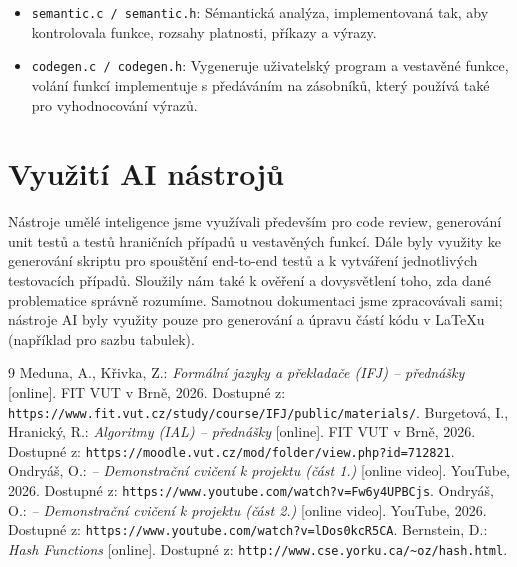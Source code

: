 \documentclass[11pt,a4paper]{article}
\begin{document}
\begin{itemize}
    \item \texttt{semantic.c / semantic.h}: Sémantická analýza, implementovaná tak, aby kontrolovala funkce, rozsahy platnosti, příkazy a výrazy.
    \item \texttt{codegen.c / codegen.h}: Vygeneruje uživatelský program a vestavěné funkce, volání funkcí implementuje s předáváním na zásobníků, který používá také pro vyhodnocování výrazů.
\end{itemize}

\newpage
\section{Využití AI nástrojů}
Nástroje umělé inteligence jsme využívali především pro code review, generování unit testů a testů hraničních případů u vestavěných funkcí. Dále byly využity ke generování skriptu pro spouštění end-to-end testů a k vytváření jednotlivých testovacích případů. Sloužily nám také k ověření a dovysvětlení toho, zda dané problematice správně rozumíme. Samotnou dokumentaci jsme zpracovávali sami; nástroje AI byly využity pouze pro generování a úpravu částí kódu v LaTeXu (například pro sazbu tabulek).

\begin{thebibliography}{9}
     Meduna, A., Křivka, Z.: \textit{Formální jazyky a překladače (IFJ) -- přednášky} [online]. FIT VUT v Brně, 2026. Dostupné z: \texttt{https://www.fit.vut.cz/study/course/IFJ/public/materials/}.
     Burgetová, I., Hranický, R.: \textit{Algoritmy (IAL) -- přednášky} [online]. FIT VUT v Brně, 2026. Dostupné z: \texttt{https://moodle.vut.cz/mod/folder/view.php?id=712821}.
     Ondryáš, O.: \textit{– Demonstrační cvičení k projektu (část 1.)} [online video]. YouTube, 2026. Dostupné z: \texttt{https://www.youtube.com/watch?v=Fw6y4UPBCjs}.
     Ondryáš, O.: \textit{– Demonstrační cvičení k projektu (část 2.)} [online video]. YouTube, 2026. Dostupné z: \texttt{https://www.youtube.com/watch?v=lDos0kcR5CA}.
     Bernstein, D.: \textit{Hash Functions} [online]. Dostupné z: \texttt{http://www.cse.yorku.ca/\textasciitilde oz/hash.html}.
\end{thebibliography}
\end{document}
